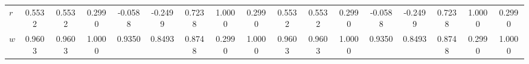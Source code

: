 \begin{center}
\begin{longtable}{lcccccccccccccccc}
$r         $	 & 	    0.5532	 & 	    0.5532	 & 	    0.2990	 & 	   -0.0588	 & 	   -0.2499	 & 	    0.7238	 & 	    1.0000	 & 	    0.2990	 & 	    0.5532	 & 	    0.5532	 & 	    0.2990	 & 	   -0.0588	 & 	   -0.2499	 & 	    0.7238	 & 	    1.0000	 & 	    0.2990 \\ 
$w         $	 & 	    0.9603	 & 	    0.9603	 & 	    1.0000	 & 	    0.9350	 & 	    0.8493	 & 	    0.8748	 & 	    0.2990	 & 	    1.0000	 & 	    0.9603	 & 	    0.9603	 & 	    1.0000	 & 	    0.9350	 & 	    0.8493	 & 	    0.8748	 & 	    0.2990	 & 	    1.0000 \\ 
\end{longtable}
 \end{center}
